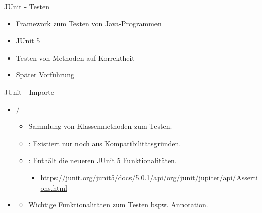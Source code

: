 \documentclass{../tuda-beamer}
\begin{document}
  \begin{frame}{JUnit - Testen}
    \begin{itemize}
      \item Framework zum Testen von Java-Programmen
      \item JUnit 5
      \item Testen von Methoden auf Korrektheit
      \item Später Vorführung
    \end{itemize}
  \end{frame}

  \begin{frame}{JUnit - Importe}
    \begin{itemize}
      \item {}/ 
      \begin{itemize}
        \item Sammlung von Klassenmethoden zum Testen.
        \item {}: Existiert nur noch aus Kompatibilitätsgründen.
        \item {}: Enthält die neueren JUnit 5 Funktionalitäten.
        \begin{itemize}
          \item \url{https://junit.org/junit5/docs/5.0.1/api/org/junit/jupiter/api/Assertions.html}
        \end{itemize}
      \end{itemize}
      \item {}
      \begin{itemize}
        \item Wichtige Funktionalitäten zum Testen bspw.  Annotation.
      \end{itemize}
    \end{itemize}
  \end{frame}
\end{document}
